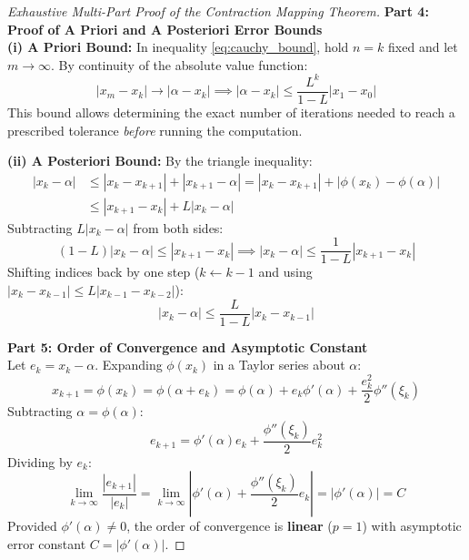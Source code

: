 \begin{proof}[Exhaustive Multi-Part Proof of the Contraction Mapping Theorem]
\medskip
\noindent\textbf{Part 4: Proof of A Priori and A Posteriori Error Bounds} \\
\textbf{(i) A Priori Bound:} In inequality \eqref{eq:cauchy_bound}, hold $n = k$ fixed and let $m \to \infty$. By continuity of the absolute value function:
\begin{equation}
    |x_m - x_k| \to |\alpha - x_k| \implies \boxed{|\alpha - x_k| \le \frac{L^k}{1 - L}|x_1 - x_0|}
\end{equation}
This bound allows determining the exact number of iterations needed to reach a prescribed tolerance \textit{before} running the computation.

\medskip
\noindent\textbf{(ii) A Posteriori Bound:} By the triangle inequality:
\begin{align}
    |x_k - \alpha| &\le |x_k - x_{k+1}| + |x_{k+1} - \alpha| = |x_k - x_{k+1}| + |\phi(x_k) - \phi(\alpha)| \nonumber \\
    &\le |x_{k+1} - x_k| + L |x_k - \alpha|
\end{align}
Subtracting $L |x_k - \alpha|$ from both sides:
\begin{equation}
    (1 - L)|x_k - \alpha| \le |x_{k+1} - x_k| \implies |x_k - \alpha| \le \frac{1}{1 - L}|x_{k+1} - x_k|
\end{equation}
Shifting indices back by one step ($k \leftarrow k - 1$ and using $|x_k - x_{k-1}| \le L|x_{k-1} - x_{k-2}|$):
\begin{equation}
    \boxed{|x_k - \alpha| \le \frac{L}{1 - L}|x_k - x_{k-1}|}
\end{equation}

\medskip
\noindent\textbf{Part 5: Order of Convergence and Asymptotic Constant} \\
Let $e_k = x_k - \alpha$. Expanding $\phi(x_k)$ in a Taylor series about $\alpha$:
\begin{equation}
    x_{k+1} = \phi(x_k) = \phi(\alpha + e_k) = \phi(\alpha) + e_k \phi'(\alpha) + \frac{e_k^2}{2} \phi''(\xi_k)
\end{equation}
Subtracting $\alpha = \phi(\alpha)$:
\begin{equation}
    e_{k+1} = \phi'(\alpha) e_k + \frac{\phi''(\xi_k)}{2} e_k^2
\end{equation}
Dividing by $e_k$:
\begin{equation}
    \lim_{k \to \infty} \frac{|e_{k+1}|}{|e_k|} = \lim_{k \to \infty} \left| \phi'(\alpha) + \frac{\phi''(\xi_k)}{2} e_k \right| = |\phi'(\alpha)| = C
\end{equation}
Provided $\phi'(\alpha) \ne 0$, the order of convergence is \textbf{linear} ($p = 1$) with asymptotic error constant $C = |\phi'(\alpha)|$.
\end{proof}


